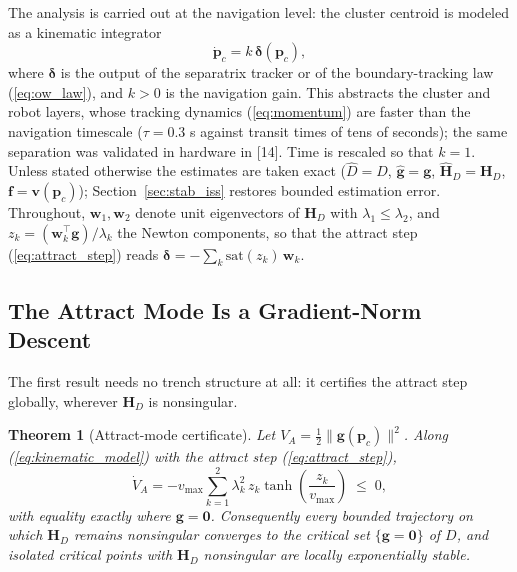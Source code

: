 \documentclass[lettersize,journal]{IEEEtran}
\newtheorem{theorem}{Theorem}
\begin{document}
The analysis is carried out at the navigation level: the cluster
centroid is modeled as a kinematic integrator
\begin{equation}
    \dot{\mathbf{p}}_c = k\,\boldsymbol{\delta}(\mathbf{p}_c),
    \label{eq:kinematic_model}
\end{equation}
where $\boldsymbol{\delta}$ is the output of the separatrix tracker or
of the boundary-tracking law (\ref{eq:ow_law}), and $k > 0$ is the
navigation gain. This abstracts the cluster and robot layers, whose
tracking dynamics (\ref{eq:momentum}) are faster than the navigation
timescale ($\tau = 0.3$ s against transit times of tens of seconds);
the same separation was validated in hardware in [14]. Time is rescaled
so that $k = 1$. Unless stated otherwise the estimates are taken exact
($\hat{D} = D$, $\hat{\mathbf{g}} = \mathbf{g}$, $\hat{\mathbf{H}}_D =
\mathbf{H}_D$, $\mathbf{f} = \mathbf{v}(\mathbf{p}_c)$);
Section~\ref{sec:stab_iss} restores bounded estimation error.
Throughout, $\mathbf{w}_1, \mathbf{w}_2$ denote unit eigenvectors of
$\mathbf{H}_D$ with $\lambda_1 \leq \lambda_2$, and $z_k =
(\mathbf{w}_k^\top \mathbf{g})/\lambda_k$ the Newton components, so
that the attract step (\ref{eq:attract_step}) reads
$\boldsymbol{\delta} = -\sum_k \mathrm{sat}(z_k)\,\mathbf{w}_k$.

\subsection{The Attract Mode Is a Gradient-Norm Descent}

The first result needs no trench structure at all: it certifies the attract step
globally, wherever $\mathbf{H}_D$ is nonsingular.

\begin{theorem}[Attract-mode certificate]
\label{thm:attract}
Let $V_A = \tfrac{1}{2}\|\mathbf{g}(\mathbf{p}_c)\|^2$. Along
(\ref{eq:kinematic_model}) with the attract step
(\ref{eq:attract_step}),
\begin{equation}
    \dot{V}_A = -v_{\max} \sum_{k=1}^{2} \lambda_k^2\,
    z_k \tanh\!\left(\frac{z_k}{v_{\max}}\right) \;\leq\; 0,
    \label{eq:VA_dot}
\end{equation}
with equality exactly where $\mathbf{g} = \mathbf{0}$. Consequently
every bounded trajectory on which $\mathbf{H}_D$ remains nonsingular
converges to the critical set $\{\mathbf{g} = \mathbf{0}\}$ of $D$, and
isolated critical points with $\mathbf{H}_D$ nonsingular are locally
exponentially stable.
\end{theorem}
\end{document}
